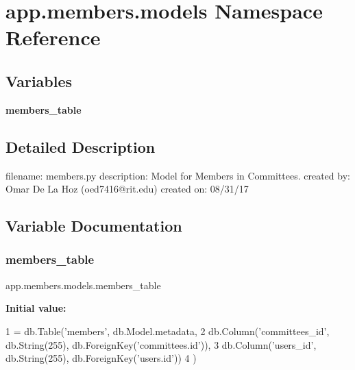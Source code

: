 \hypertarget{namespaceapp_1_1members_1_1models}{}\section{app.\+members.\+models Namespace Reference}
\label{namespaceapp_1_1members_1_1models}
\subsection*{Variables}
\begin{DoxyCompactItemize}
\item 
{\bfseries members\+\_\+table}
\end{DoxyCompactItemize}


\subsection{Detailed Description}
\begin{DoxyVerb}filename: members.py
description: Model for Members in Committees.
created by: Omar De La Hoz (oed7416@rit.edu)
created on: 08/31/17
\end{DoxyVerb}
 

\subsection{Variable Documentation}
\mbox{\label{namespaceapp_1_1members_1_1models_a0a54bcbc283b250025eed1d910e0071d}} 
\subsubsection{\texorpdfstring{members\+\_\+table}{members\_table}}
{\footnotesize\ttfamily app.\+members.\+models.\+members\+\_\+table}

{\bfseries Initial value\+:}
\begin{DoxyCode}
1 =  db.Table(\textcolor{stringliteral}{'members'}, db.Model.metadata,
2     db.Column(\textcolor{stringliteral}{'committees\_id'}, db.String(255), db.ForeignKey(\textcolor{stringliteral}{'committees.id'})),
3     db.Column(\textcolor{stringliteral}{'users\_id'}, db.String(255), db.ForeignKey(\textcolor{stringliteral}{'users.id'}))
4 )
\end{DoxyCode}
